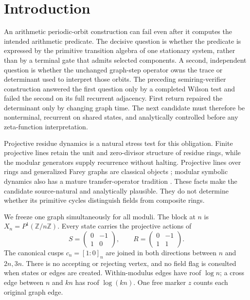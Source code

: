 \section{Introduction}
\label{sec:introduction}

An arithmetic periodic-orbit construction can fail even after it computes
the intended arithmetic predicate.  The decisive question is whether the
predicate is expressed by the primitive transition algebra of one stationary
system, rather than by a terminal gate that admits selected components.  A
second, independent question is whether the unchanged graph-step operator
owns the trace or determinant used to interpret those orbits.  The preceding
semiring-verifier construction answered the first question only by a
completed Wilson test and failed the second on its full recurrent adjacency.
First return repaired the determinant only by changing graph time.  The next
candidate must therefore be nonterminal, recurrent on shared states, and
analytically controlled before any zeta-function interpretation.

Projective residue dynamics is a natural stress test for this obligation.
Finite projective lines retain the unit and zero-divisor structure of residue
rings, while the modular generators supply recurrence without halting.
Projective lines over rings and generalized Farey graphs are classical
objects
\citep{blunck2000projective,jones1991modular,saniga2007classification};
modular symbolic dynamics also has a mature transfer-operator tradition
\citep{mayer1991thermodynamic,katok2006symbolic}.  These facts make the
candidate source-natural and analytically plausible.  They do not determine
whether its primitive cycles distinguish fields from composite rings.

We freeze one graph simultaneously for all moduli.  The block at $n$ is
$X_n=P^1(\mathbb Z/n\mathbb Z)$.  Every state carries the projective actions
of
\[
 S=\begin{pmatrix}0&-1\\1&0\end{pmatrix},\qquad
 R=\begin{pmatrix}0&-1\\1&1\end{pmatrix}.
\]
The canonical cusps $c_n=[1:0]_n$ are joined in both directions between $n$
and $2n,3n$.  There is no accepting or rejecting vertex, and no field flag is
consulted when states or edges are created.  Within-modulus edges have roof
$\log n$; a cross edge between $n$ and $kn$ has roof $\log(kn)$.  One free
marker $z$ counts each original graph edge.

